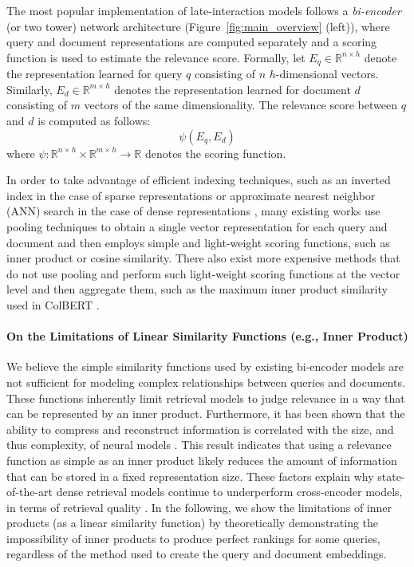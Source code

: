 \documentclass[sigconf,]{acmart}
\begin{document}
The most popular implementation of late-interaction models follows a \textit{bi-encoder} (or two tower) network architecture (Figure~\ref{fig:main_overview} (left)), where query and document representations are computed separately and a scoring function is used to estimate the relevance score. Formally, let $E_q \in \mathbb{R}^{n \times h}$ denote the representation learned for query $q$ consisting of $n$ $h$-dimensional vectors. Similarly, $E_d \in \mathbb{R}^{m \times h}$ denotes the representation learned for document $d$ consisting of $m$ vectors of the same dimensionality. The relevance score between $q$ and $d$ is computed as follows:
\begin{equation}
    \psi(E_q, E_d)
\end{equation}
where $\psi: \mathbb{R}^{n \times h} \times \mathbb{R}^{m \times h} \rightarrow \mathbb{R}$ denotes the scoring function.

In order to take advantage of efficient indexing techniques, such as an inverted index in the case of sparse representations \cite{SNRM, SPLADE} or approximate nearest neighbor (ANN) search in the case of dense representations \cite{DPR}, many existing works use pooling techniques to obtain a single vector representation for each query and document and then employs simple and light-weight scoring functions, such as inner product or cosine similarity. There also exist more expensive methods that do not use pooling and perform such light-weight scoring functions at the vector level and then aggregate them, such as the maximum inner product similarity used in ColBERT \cite{ColBERT_v1}.

\paragraph{\textbf{On the Limitations of Linear Similarity Functions (e.g., Inner Product)}}
We believe the simple similarity functions used by existing bi-encoder models are not sufficient for modeling complex relationships between queries and documents. These functions inherently limit retrieval models to judge relevance in a way that can be represented by an inner product. Furthermore, it has been shown that the ability to compress and reconstruct information is correlated with the size, and thus complexity, of neural models \cite{LanguageModelingIsCompression}. This result indicates that using a relevance function as simple as an inner product likely reduces the amount of information that can be stored in a fixed representation size.
These factors explain why state-of-the-art dense retrieval models continue to underperform cross-encoder models, in terms of retrieval quality \cite{lin2022pretrained}. In the following, we show the limitations of inner products (as a linear similarity function) by theoretically demonstrating the impossibility of inner products to produce perfect rankings for some queries, regardless of the method used to create the query and document embeddings.
\end{document}
